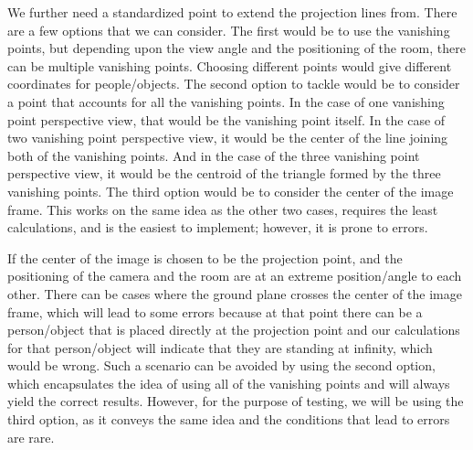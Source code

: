 We further need a standardized point to extend the projection lines from. There are a few options that we can consider. The first would be to use the vanishing points, but depending upon the view angle and the positioning of the room, there can be multiple vanishing points. Choosing different points would give different coordinates for people/objects. The second option to tackle would be to consider a point that accounts for all the vanishing points. In the case of one vanishing point perspective view, that would be the vanishing point itself. In the case of two vanishing point perspective view, it would be the center of the line joining both of the vanishing points. And in the case of the three vanishing point perspective view, it would be the centroid of the triangle formed by the three vanishing points. The third option would be to consider the center of the image frame. This works on the same idea as the other two cases, requires the least calculations, and is the easiest to implement; however, it is prone to errors.\newline

If the center of the image is chosen to be the projection point, and the positioning of the camera and the room are at an extreme position/angle to each other. There can be cases where the ground plane crosses the center of the image frame, which will lead to some errors because at that point there can be a person/object that is placed directly at the projection point and our calculations for that person/object will indicate that they are standing at infinity, which would be wrong. Such a scenario can be avoided by using the second option, which encapsulates the idea of using all of the vanishing points and will always yield the correct results. However, for the purpose of testing, we will be using the third option, as it conveys the same idea and the conditions that lead to errors are rare.\newline

